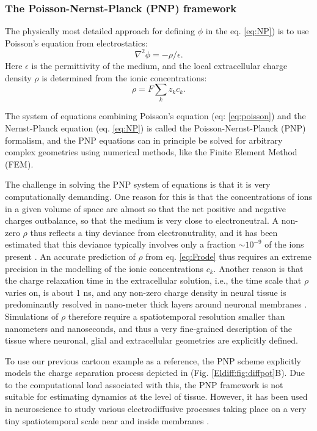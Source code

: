 \subsubsection{The Poisson-Nernst-Planck (PNP) framework}
The physically most detailed approach for defining $\phi$ in the eq. \ref{eq:NP}) is to use Poisson's equation from electrostatics:
\begin{equation}
\nabla^2 \phi = -\rho/\epsilon.
\label{eq:poisson}
\end{equation}
Here $\epsilon$ is the permittivity of the medium, and the local extracellular charge density $\rho$ is determined from the ionic concentrations: 
\begin{equation}
\rho = F \sum_k z_k c_k.
\label{eq:Frode}
\end{equation}

The system of equations combining Poisson's equation (eq: \ref{eq:poisson}) and the Nernst-Planck equation (eq. \ref{eq:NP})
is called the Poisson-Nernst-Planck (PNP) formalism, and the PNP equations can in principle be solved for arbitrary complex geometries using numerical methods, like the Finite Element Method (FEM). 

The challenge in solving the PNP system of equations is that it is very computationally demanding. One reason for this is that the concentrations of ions in a given volume of space are almost so that the net positive and negative charges outbalance, so that the medium is very close to electroneutral. A non-zero $\rho$ thus reflects a tiny deviance from electronutrality, and it has been estimated that this deviance typically involves only a fraction $\sim 10^{-9}$ of the ions present \cite{Aguilella1986}. An accurate prediction of $\rho$ from eq. \ref{eq:Frode} thus requires an extreme precision in the modelling of the ionic concentrations $c_k$. Another reason is that the charge relaxation time in the extracellular solution, i.e., the time scale that $\rho$ varies on, is about 1 ns, and any non-zero charge density in neural tissue is predominantly resolved in nano-meter thick layers around neuronal membranes \cite{Grodzinsky2011, Gratiy2017}. Simulations of $\rho$ therefore require a spatiotemporal resolution smaller than nanometers and nanoseconds, and thus a very fine-grained description of the tissue where neuronal, glial and extracellular geometries are explicitly defined.

To use our previous cartoon example as a reference, the PNP scheme explicitly models the charge separation process depicted in (Fig. \ref{Eldiff:fig:diffpot}B). Due to the computational load associated with this, the PNP framework is not suitable for estimating dynamics at the level of tissue. However, it has been used in neuroscience to study various electrodiffusive processes taking place on a very tiny spatiotemporal scale near and inside membranes \cite{Leonetti1998, Leonetti2004, Lu2007, Lopreore2008, Nanninga2008, Pods2013, Gardner2015}. 


